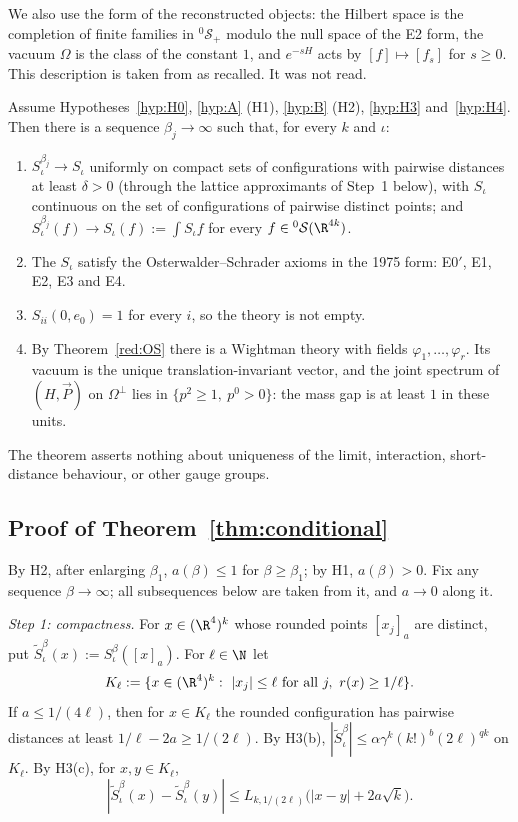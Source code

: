 We also use the form of the reconstructed objects: the Hilbert space is the completion of finite families in ${}^0\mathcal S_+$ modulo the null space of the E2 form, the vacuum $\Omega$ is the class of the constant $1$, and $e^{-sH}$ acts by $[f]\mapsto[f_s]$ for $s\ge0$. This description is taken from \cite[Section~4]{OS73} as recalled. It was not read.

\begin{theorem}[Theorem S]\label{thm:conditional}
Assume Hypotheses~\ref{hyp:H0}, \ref{hyp:A} (H1), \ref{hyp:B} (H2), \ref{hyp:H3} and~\ref{hyp:H4}. Then there is a sequence $\beta_j\to\infty$ such that, for every $k$ and $\iota$:
\begin{enumerate}
\item $S^{\beta_j}_\iota\to S_\iota$ uniformly on compact sets of configurations with pairwise distances at least $\delta>0$ (through the lattice approximants of Step~1 below), with $S_\iota$ continuous on the set of configurations of pairwise distinct points; and $S^{\beta_j}_\iota(f)\to S_\iota(f):=\int S_\iota f$ for every $f\in{}^0\mathcal S(\R^{4k})$.
\item The $S_\iota$ satisfy the Osterwalder--Schrader axioms in the 1975 form: E0$'$, E1, E2, E3 and E4.
\item $S_{ii}(0,e_0)=1$ for every $i$, so the theory is not empty.
\item By Theorem~\ref{red:OS} there is a Wightman theory with fields $\varphi_1,\dots,\varphi_r$. Its vacuum is the unique translation-invariant vector, and the joint spectrum of $(H,\vec P)$ on $\Omega^\perp$ lies in $\{p^2\ge1,\ p^0>0\}$: the mass gap is at least $1$ in these units.
\end{enumerate}
The theorem asserts nothing about uniqueness of the limit, interaction, short-distance behaviour, or other gauge groups.
\end{theorem}

\subsection{Proof of Theorem~\ref{thm:conditional}}\label{red:S-proof}

By H2, after enlarging $\beta_1$, $a(\beta)\le1$ for $\beta\ge\beta_1$; by H1, $a(\beta)>0$. Fix any sequence $\beta\to\infty$; all subsequences below are taken from it, and $a\to0$ along it.

\emph{Step 1: compactness.} For $x\in(\R^4)^k$ whose rounded points $[x_j]_a$ are distinct, put $\tilde S^\beta_\iota(x):=S^\beta_\iota([x]_a)$. For $\ell\in\N$ let
\[
  K_\ell:=\{x\in(\R^4)^k:\ |x_j|\le\ell\text{ for all }j,\ r(x)\ge1/\ell\}.
\]
If $a\le1/(4\ell)$, then for $x\in K_\ell$ the rounded configuration has pairwise distances at least $1/\ell-2a\ge1/(2\ell)$. By H3(b), $|\tilde S^\beta_\iota|\le\alpha\gamma^k(k!)^b(2\ell)^{qk}$ on $K_\ell$. By H3(c), for $x,y\in K_\ell$,
\begin{equation}\label{red:asym-eq}
  |\tilde S^\beta_\iota(x)-\tilde S^\beta_\iota(y)|\le L_{k,1/(2\ell)}\bigl(|x-y|+2a\sqrt k\bigr).
\end{equation}

